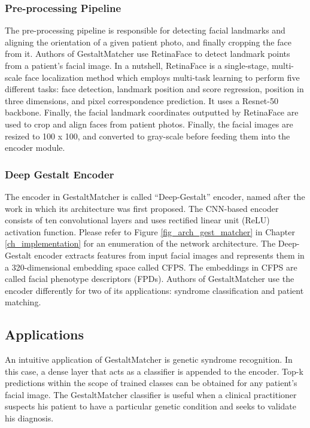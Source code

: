 \documentclass[../report.tex]{subfiles}
\begin{document}
    \subsubsection{Pre-processing Pipeline}
    The pre-processing pipeline is responsible for detecting facial landmarks and aligning the orientation of a given patient photo, and finally cropping the face from it. Authors of GestaltMatcher use RetinaFace \cite{deng2020retinaface} to detect landmark points from a patient's facial image.  In a nutshell, RetinaFace is a single-stage, multi-scale face localization method which employs multi-task learning to perform five different tasks: face detection, landmark position and score regression, position in three dimensions, and pixel correspondence prediction. It uses a Resnet-50 \cite{he2016deep} backbone. Finally, the facial landmark coordinates outputted by RetinaFace are used to crop and align faces from patient photos. Finally, the facial images are resized to 100 x 100, and converted to gray-scale before feeding them into the encoder module.
    
    \subsubsection{Deep Gestalt Encoder}
    The encoder in GestaltMatcher is called \enquote{Deep-Gestalt} encoder, named after the work \cite{Gurovich2019} in which its architecture was first proposed. The CNN-based encoder consists of ten convolutional layers and uses rectified linear unit (ReLU) activation function. Please refer to Figure \ref{fig_arch_gest_matcher} in Chapter \ref{ch_implementation} for an enumeration of the network architecture. The Deep-Gestalt encoder extracts features from input facial images and represents them in a 320-dimensional embedding space called CFPS. The embeddings in CFPS are called facial phenotype descriptors (FPDs). Authors of GestaltMatcher use the encoder differently for two of its applications: syndrome classification and patient matching.
    
    \subsection{Applications}
    \noindent
    An intuitive application of GestaltMatcher is genetic syndrome recognition. In this case, a dense layer that acts as a classifier is appended to the encoder. Top-k predictions within the scope of trained classes can be obtained for any patient's facial image. The GestaltMatcher classifier is useful when a clinical practitioner suspects his patient to have a particular genetic condition and seeks to validate his diagnosis.
    
\end{document}
